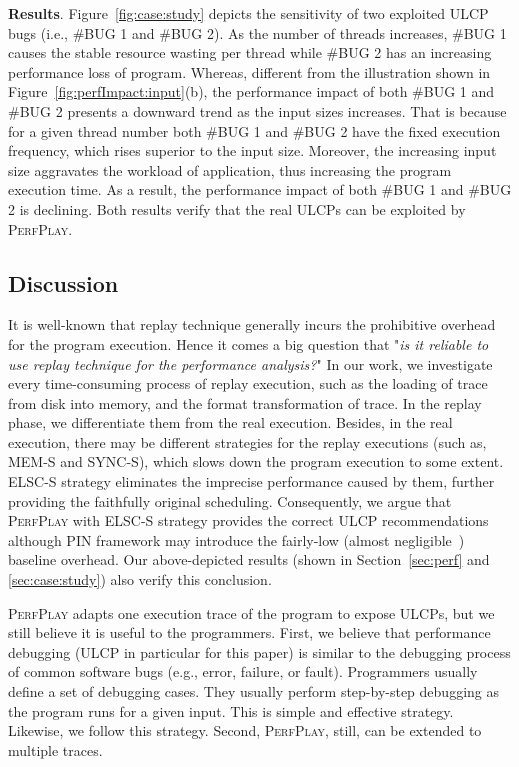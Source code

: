 \textbf{Results}. Figure~\ref{fig:case:study} depicts the sensitivity of two exploited ULCP bugs (i.e., \#BUG 1 and \#BUG 2). As the number of threads increases, \#BUG 1 causes the stable resource wasting per thread while \#BUG 2 has an increasing performance loss of program. Whereas, different from the illustration shown in Figure~\ref{fig:perfImpact:input}(b), the performance impact of both \#BUG 1 and \#BUG 2 presents a downward trend as the input sizes increases. That is because for a given thread number both \#BUG 1 and \#BUG 2 have the fixed execution frequency, which rises superior to the input size. Moreover, the increasing input size aggravates the workload of application, thus increasing the program execution time. As a result, the performance impact of both \#BUG 1 and \#BUG 2 is declining. Both results verify that the real ULCPs can be exploited by \textsc{PerfPlay}.
\subsection{Discussion}
It is well-known that replay technique generally incurs the prohibitive overhead for the program execution. Hence it comes a big question that "\emph{is it reliable to use replay technique for the performance analysis?}" In our work, we investigate every time-consuming process of replay execution, such as the loading of trace from disk into memory, and the format transformation of trace. In the replay phase, we differentiate them from the real execution. Besides, in the real execution, there may be different strategies for the replay executions (such as, MEM-S and SYNC-S), which slows down the program execution to some extent. ELSC-S strategy eliminates the imprecise performance caused by them, further providing the faithfully original scheduling. Consequently, we argue that \textsc{PerfPlay} with ELSC-S strategy provides the correct ULCP recommendations although PIN framework may introduce the fairly-low (almost negligible~\cite{PIN}) baseline overhead. Our above-depicted results (shown in Section~\ref{sec:perf} and \ref{sec:case:study}) also verify this conclusion.

\textsc{PerfPlay} adapts one execution trace of the program to expose ULCPs, but we still believe it is useful to the programmers. First, we believe that performance debugging (ULCP in particular for this paper) is similar to the debugging process of common software bugs (e.g., error, failure, or fault). Programmers usually define a set of debugging cases. They usually perform step-by-step debugging as the program runs for a given input. This is simple and effective strategy. Likewise, we follow this strategy. Second, \textsc{PerfPlay}, still, can be extended to multiple traces.
